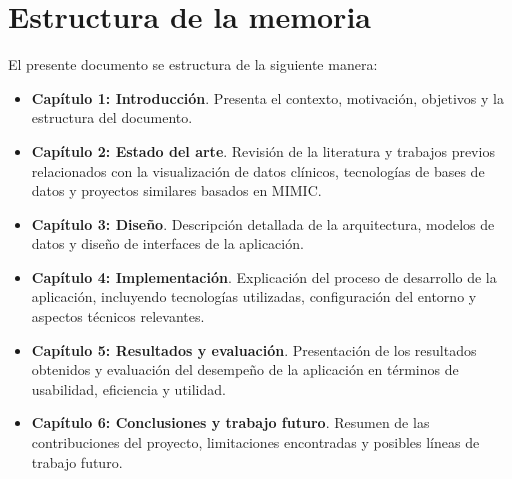 \section{Estructura de la memoria}

El presente documento se estructura de la siguiente manera:

\begin{itemize}
    \item \textbf{Capítulo 1: Introducción}. Presenta el contexto, motivación, objetivos y la estructura del documento.
    
    \item \textbf{Capítulo 2: Estado del arte}. Revisión de la literatura y trabajos previos relacionados con la visualización de datos clínicos, tecnologías de bases de datos y proyectos similares basados en MIMIC.
    
    \item \textbf{Capítulo 3: Diseño}. Descripción detallada de la arquitectura, modelos de datos y diseño de interfaces de la aplicación.
    
    \item \textbf{Capítulo 4: Implementación}. Explicación del proceso de desarrollo de la aplicación, incluyendo tecnologías utilizadas, configuración del entorno y aspectos técnicos relevantes.
    
    \item \textbf{Capítulo 5: Resultados y evaluación}. Presentación de los resultados obtenidos y evaluación del desempeño de la aplicación en términos de usabilidad, eficiencia y utilidad.
    
    \item \textbf{Capítulo 6: Conclusiones y trabajo futuro}. Resumen de las contribuciones del proyecto, limitaciones encontradas y posibles líneas de trabajo futuro.
\end{itemize}

